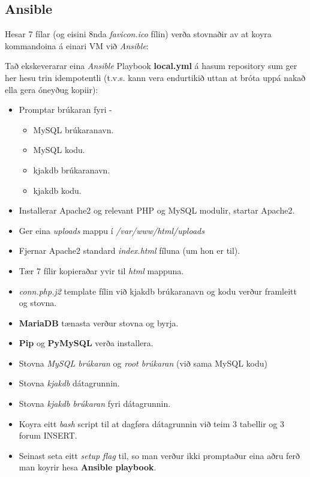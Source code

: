\documentclass{article}
\begin{document}
\subsection{Ansible}
\par Hesar 7 fílar (og eisini 8nda \textit{favicon.ico} fílin) verða stovnaðir
av at koyra kommandoina á einari VM við \textit{Ansible}:
\newline
\newline
{}
\newline
\par Tað ekskeverarar eina \textit{Ansible} Playbook \textbf{local.yml} á hasum
repository sum ger her hesu trin idempotentli (t.v.s. kann vera endurtikið uttan at
bróta uppá nakað ella gera óneyðug kopiir):
\begin{itemize}
    \item Promptar brúkaran fyri -
    \begin{itemize}
        \item MySQL brúkaranavn.
        \item MySQL kodu.
        \item kjakdb brúkaranavn.
        \item kjakdb kodu.
    \end{itemize}
    \item Installerar Apache2 og relevant PHP og MySQL modulir, startar Apache2.
    \item Ger eina \textit{uploads} mappu í \textit{/var/www/html/uploads}
    \item Fjernar Apache2 standard \textit{index.html} fíluna (um hon er til).
    \item Tær 7 fílir kopieraðar yvir til \textit{html} mappuna.
    \item \textit{conn.php.j2} template fílin við kjakdb brúkaranavn
            og kodu verður framleitt og stovna.
    \item \textbf{MariaDB} tænasta verður stovna og byrja.
    \item \textbf{Pip} og \textbf{PyMySQL} verða installera.
    \item Stovna \textit{MySQL brúkaran} og \textit{root brúkaran} (við sama MySQL kodu)
    \item Stovna \textit{kjakdb} dátagrunnin.
    \item Stovna \textit{kjakdb brúkaran} fyri dátagrunnin.
    \item Koyra eitt \textit{bash} script til at dagføra dátagrunnin
            við teim 3 tabellir og 3 forum INSERT.
    \item Seinast seta eitt \textit{setup flag} til, so man verður ikki promptaður eina
            aðru ferð man koyrir hesa \textbf{Ansible playbook}.
\end{itemize}
\end{document}
